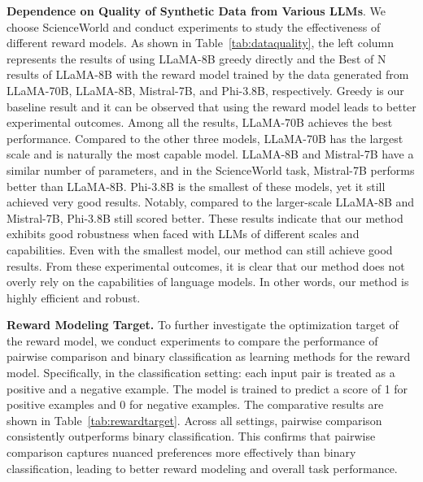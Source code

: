 \textbf{Dependence on Quality of Synthetic Data from Various LLMs}. We choose ScienceWorld and conduct experiments to study the effectiveness of different reward models. As shown in Table~\ref{tab:dataquality}, the left column represents the results of using LLaMA-8B greedy directly and the Best of N results of LLaMA-8B with the reward model trained by the data generated from LLaMA-70B, LLaMA-8B, Mistral-7B, and Phi-3.8B, respectively. Greedy is our baseline result and it can be observed that using the reward model leads to better experimental outcomes. 
Among all the results, LLaMA-70B achieves the best performance. Compared to the other three models, LLaMA-70B has the largest scale and is naturally the most capable model. LLaMA-8B and Mistral-7B have a similar number of parameters, and in the ScienceWorld task, Mistral-7B performs better than LLaMA-8B. Phi-3.8B is the smallest of these models, yet it still achieved very good results. Notably, compared to the larger-scale LLaMA-8B and Mistral-7B, Phi-3.8B still scored better. These results indicate that our method exhibits good robustness when faced with LLMs of different scales and capabilities. Even with the smallest model, our method can still achieve good results. From these experimental outcomes, it is clear that our method does not overly rely on the capabilities of language models. In other words, our method is highly efficient and robust.
 


\textbf{Reward Modeling Target.} To further investigate the optimization target of the reward model, we conduct experiments to compare the performance of pairwise comparison and binary classification as learning methods for the reward model. Specifically, in the classification setting: each input pair is treated as a positive and a negative example. The model is trained to predict a score of 1 for positive examples and 0 for negative examples.
The comparative results are shown in Table~\ref{tab:rewardtarget}. Across all settings, pairwise comparison consistently outperforms binary classification. This confirms that pairwise comparison captures nuanced preferences more effectively than binary classification, leading to better reward modeling and overall task performance.
 

